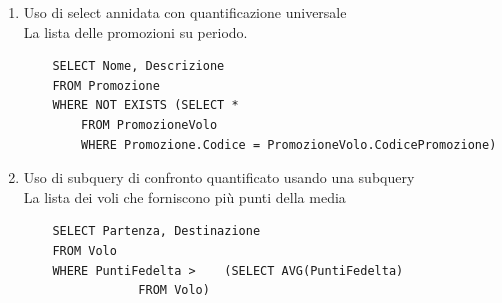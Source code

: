 \documentclass[10pt]{article}
\begin{document}
\begin{enumerate}
	\item Uso di select annidata con quantificazione universale\\
	La lista delle promozioni su periodo.
	\begin{lstlisting}
	SELECT Nome, Descrizione
	FROM Promozione
	WHERE NOT EXISTS (SELECT *
		FROM PromozioneVolo
		WHERE Promozione.Codice = PromozioneVolo.CodicePromozione)
	\end{lstlisting}
	\pagebreak
	\item Uso di subquery di confronto quantificato usando una subquery\\
	La lista dei voli che forniscono più punti della media
	\begin{lstlisting}
	SELECT Partenza, Destinazione
	FROM Volo
	WHERE PuntiFedelta >	(SELECT AVG(PuntiFedelta)
				FROM Volo)
	\end{lstlisting}
	
\end{enumerate}
\end{document}
